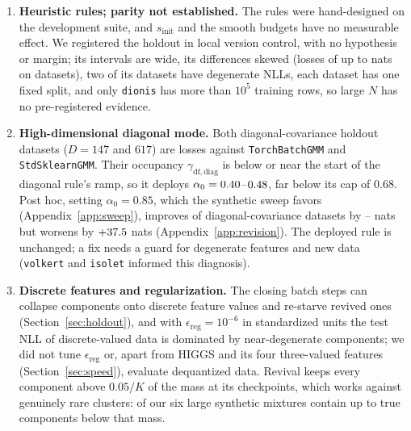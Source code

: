 \documentclass[10pt]{article} %
\begin{document}
\begin{enumerate}[leftmargin=*,nosep]
  \item \textbf{Heuristic rules; parity not established.} The rules were hand-designed on the development suite, and $s_{\mathrm{init}}$ and the smooth budgets have no measurable effect. We registered the holdout in local version control, with no hypothesis or margin; its intervals are wide, its differences skewed (losses of up to \rRTorchBatchGMMBigLossMax{} nats on \rRTorchBatchGMMNBigLoss{} datasets), two of its datasets have degenerate NLLs, each dataset has one fixed split, and only \texttt{dionis} has more than $10^5$ training rows, so large $N$ has no pre-registered evidence.
  \item \textbf{High-dimensional diagonal mode.} Both diagonal-covariance holdout datasets ($D = 147$ and $617$) are losses against \texttt{TorchBatchGMM} and \texttt{StdSklearnGMM}. Their occupancy $\gamma_{\mathrm{df,diag}}$ is below or near the start of the diagonal rule's ramp, so it deploys $\alpha_0 = 0.40$--$0.48$, far below its cap of $0.68$. Post hoc, setting $\alpha_0 = 0.85$, which the synthetic sweep favors (Appendix~\ref{app:sweep}), improves \rXDiagAImproved{} of \rXnDiag{} diagonal-covariance datasets by \rXDiagAImpMin--\rXDiagAImpMax{} nats but worsens \texttt{\rXDiagAWorstName} by $+37.5$ nats (Appendix~\ref{app:revision}). The deployed rule is unchanged; a fix needs a guard for degenerate features and new data (\texttt{volkert} and \texttt{isolet} informed this diagnosis).
  \item \textbf{Discrete features and regularization.} The closing batch steps can collapse components onto discrete feature values and re-starve revived ones (Section~\ref{sec:holdout}), and with $\epsilon_{\mathrm{reg}} = 10^{-6}$ in standardized units the test NLL of discrete-valued data is dominated by near-degenerate components; we did not tune $\epsilon_{\mathrm{reg}}$ or, apart from HIGGS and its four three-valued features (Section~\ref{sec:speed}), evaluate dequantized data. Revival keeps every component above $0.05/K$ of the mass at its checkpoints, which works against genuinely rare clusters: \rSSynRareN{} of our six large synthetic mixtures contain up to \rSSynRareMax{} true components below that mass.

\end{enumerate}
\end{document}

